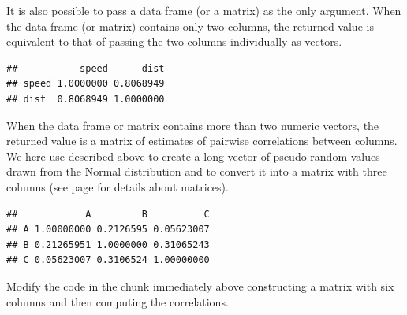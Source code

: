 \documentclass[krantz2]{krantz}\usepackage{knitr}
\begin{document}
It is also possible to pass a data frame (or a matrix) as the only argument. When the data frame (or matrix) contains only two columns, the returned value is equivalent to that of passing the two columns individually as vectors.

\begin{knitrout}\footnotesize
{}\color{fgcolor}\begin{kframe}
\begin{alltt}
\end{alltt}
\begin{verbatim}
##           speed      dist
## speed 1.0000000 0.8068949
## dist  0.8068949 1.0000000
\end{verbatim}
\end{kframe}
\end{knitrout}

When the data frame or matrix contains more than two numeric vectors, the returned value is a matrix of estimates of pairwise correlations between columns. We here use  described above to create a long vector of pseudo-random values drawn from the Normal distribution and  to convert it into a matrix with three columns (see page \pageref{sec:matrix:array} for details about \Rlang matrices).

\begin{knitrout}\footnotesize
{}\color{fgcolor}\begin{kframe}
\begin{alltt}
 \hlkwb{<-} \hlstd{(}\hlstd{(}\hlstd{),}  \hlstd{=} \hlstd{,}
                  \hlstd{=} \hlstd{(} \hlstd{=} \hlopt{:}\hlstd{,}  \hlstd{=} \hlstd{(}\hlstd{,} \hlstd{,} \hlstd{)))}
\end{alltt}
\begin{verbatim}
##            A         B          C
## A 1.00000000 0.2126595 0.05623007
## B 0.21265951 1.0000000 0.31065243
## C 0.05623007 0.3106524 1.00000000
\end{verbatim}
\end{kframe}
\end{knitrout}

\begin{playground}
Modify the code in the chunk immediately above constructing a matrix with six columns and then computing the correlations.
\end{playground}
\end{document}
